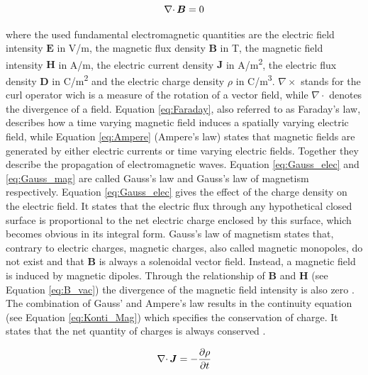 \begin{equation}
\label{eq:Gauss_mag}
\centering
\nabla\cdotp\boldsymbol{B} = 0
\end{equation}

where the used fundamental electromagnetic quantities are the electric field intensity $\boldsymbol{E}$ in V/m, the magnetic flux density $\boldsymbol{B}$ in T, the magnetic field intensity $\boldsymbol{H}$ in A/m, the electric current density $\boldsymbol{J}$ in A/m\textsuperscript{2}, the electric flux density $\boldsymbol{D}$ in C/m\textsuperscript{2} and the electric charge density $\rho$ in C/m\textsuperscript{3}. $\nabla\times$ stands for the curl operator wich is a measure of the rotation of a vector field, while $\nabla\cdotp$ denotes the divergence of a field. Equation \ref{eq:Faraday}, also referred to as Faraday's law, describes how a time varying magnetic field induces a spatially varying electric field, while Equation \ref{eq:Ampere} (Ampere's law) states that magnetic fields are generated by either electric currents or time varying electric fields. Together they describe the propagation of electromagnetic waves. Equation \ref{eq:Gauss_elec} and \ref{eq:Gauss_mag} are called Gauss's law and Gauss's law of magnetism respectively. Equation \ref{eq:Gauss_elec} gives the effect of the charge density on the electric field. It states that the electric flux through any hypothetical closed surface is proportional to the net electric charge enclosed by this surface, which becomes obvious in its integral form. Gauss's law of magnetism states that, contrary to electric charges, magnetic charges, also called magnetic monopoles, do not exist and that $\boldsymbol{B}$ is always a solenoidal vector field. Instead, a magnetic field is induced by magnetic dipoles. Through the relationship of $\boldsymbol{B}$ and $\boldsymbol{H}$ (see Equation \ref{eq:B_vac}) the divergence of the magnetic field intensity is also zero \cite{monk2003finite}\cite{kallenbach2018elektromagnete}.
The combination of Gauss' and Ampere's law results in the continuity equation (see Equation \ref{eq:Konti_Mag}) which specifies the conservation of charge. It states that the net quantity of charges is always conserved \cite{monk2003finite}\cite{meschede2015gerthsen}\cite{schwab2013begriffswelt}.   

\begin{equation}
\label{eq:Konti_Mag}
\centering
\nabla\cdotp\boldsymbol{J} = -\frac{\partial\rho}{\partial t}
\end{equation}

